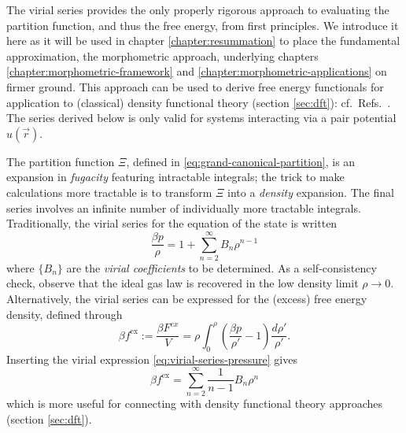 The virial series provides the only properly rigorous approach to evaluating the partition function, and thus the free energy, from first principles.
We introduce it here as it will be used in chapter \ref{chapter:resummation} to place the fundamental approximation, the morphometric approach, underlying chapters \ref{chapter:morphometric-framework} and \ref{chapter:morphometric-applications} on firmer ground.
This approach can be used to derive free energy functionals for application to (classical) density functional theory (section \ref{sec:dft}): cf.\ Refs.\ \cite{LeithallPRE2011,KordenPRE2012,MarechalPRE2014}.
The series derived below is only valid for systems interacting via a pair potential $u(\vec{r})$.

The partition function $\Xi$, defined in \eqref{eq:grand-canonical-partition}, is an expansion in \emph{fugacity} featuring intractable integrals; the trick to make calculations more tractable is to transform $\Xi$ into a \emph{density} expansion.
The final series involves an infinite number of individually more tractable integrals.
Traditionally, the virial series for the equation of the state is written
\begin{equation}\label{eq:virial-series-pressure}
  \frac{\beta p}{\rho}
  =
  1 + \sum_{n=2}^\infty B_n \rho^{n-1}
\end{equation}
where $\{B_n\}$ are the \emph{virial coefficients} to be determined.
As a self-consistency check, observe that the ideal gas law is recovered in the low density limit $\rho \to 0$.
Alternatively, the virial series can be expressed for the (excess) free energy density, defined through
\begin{equation}\label{eq:free-energy-density}
  \beta f^\mathrm{ex}
  :=
  \frac{\beta F^{ex}}{V}
  =
  \rho \int_0^\rho \left( \frac{\beta p}{\rho'} - 1 \right)
  \frac{d\rho'}{\rho'}.
\end{equation}
Inserting the virial expression \eqref{eq:virial-series-pressure} gives
\begin{equation}\label{eq:virial-series-excess-free-energy}
  \beta f^\mathrm{ex}
  =
  \sum_{n=2}^\infty
  \frac{1}{n-1}
  B_n
  \rho^n
\end{equation}
which is more useful for connecting with density functional theory approaches (section \ref{sec:dft}).

